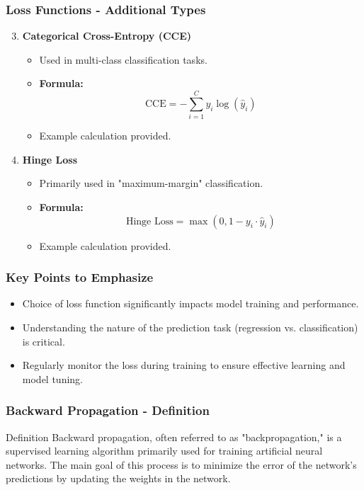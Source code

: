 \documentclass[aspectratio=169]{beamer}
\begin{document}
\begin{frame}[fragile]
    \frametitle{Loss Functions - Additional Types}
    \begin{enumerate}\setcounter{enumi}{2}
        \item \textbf{Categorical Cross-Entropy (CCE)}
            \begin{itemize}
                \item Used in multi-class classification tasks.
                \item \textbf{Formula:} 
                \begin{equation}
                    \text{CCE} = -\sum_{i=1}^{C} y_i \log(\hat{y}_i)
                \end{equation}
                \item Example calculation provided.
            \end{itemize}

        \item \textbf{Hinge Loss}
            \begin{itemize}
                \item Primarily used in "maximum-margin" classification.
                \item \textbf{Formula:} 
                \begin{equation}
                    \text{Hinge Loss} = \max(0, 1 - y_i \cdot \hat{y}_i)
                \end{equation}
                \item Example calculation provided.
            \end{itemize}
    \end{enumerate}
\end{frame}

\begin{frame}[fragile]
    \frametitle{Key Points to Emphasize}
    \begin{itemize}
        \item Choice of loss function significantly impacts model training and performance.
        \item Understanding the nature of the prediction task (regression vs. classification) is critical.
        \item Regularly monitor the loss during training to ensure effective learning and model tuning.
    \end{itemize}
\end{frame}

\begin{frame}[fragile]
    \frametitle{Backward Propagation - Definition}
    \begin{block}{Definition}
        Backward propagation, often referred to as "backpropagation," is a supervised learning algorithm primarily used for training artificial neural networks. 
        The main goal of this process is to minimize the error of the network's predictions by updating the weights in the network.
    \end{block}
\end{frame}
\end{document}
